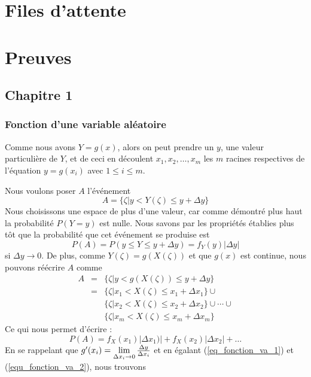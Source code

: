 \documentclass[11pt,a4paper]{article}
\numberwithin{equation}{section}
\begin{document}

\section{Files d'attente}

\appendix
\titleformat{\section}{\large\bfseries}{}{0pt}{\thesection\quad}
\section{Preuves}
\subsection{Chapitre 1}
\subsubsection{Fonction d'une variable aléatoire}
\label{preuve_fonction_va}
Comme nous avons $Y = g(x)$, alors on peut prendre un $y$, une valeur particulière de $Y$, et de ceci en découlent $x_1,x_2,\ldots,x_m$ les $m$ racines respectives de l'équation $y = g(x_i)$ avec $1 \leq i \leq m$.

Nous voulons poser $A$ l'événement 
\[A = \{\zeta| y < Y(\zeta) \leq y+\Delta y\}\]
Nous choisissons une espace de plus d'une valeur, car comme démontré plus haut la probabilité $P(Y=y)$ est nulle. Nous savons par les propriétés établies plus tôt que la probabilité que cet événement se produise est 
\begin{equation}
    P(A) = P(y \leq Y \leq y+\Delta y) = f_Y(y)|\Delta y|
    \label{eq_fonction_va_1}
\end{equation}
si $\Delta y \to 0$. De plus, comme $Y(\zeta) = g(X(\zeta))$ et que $g(x)$ est continue, nous pouvons réécrire $A$ comme
\[\begin{array}{lll}
    A   &=& \{\zeta | y <  g(X(\zeta)) \leq y+\Delta y\}\\
        &=& \{\zeta | x_1 < X(\zeta) \leq x_1+\Delta x_1\} \cup \\
        &&\{\zeta | x_2 < X(\zeta) \leq x_2+\Delta x_2\} \cup \cdots \cup\\
        && \{\zeta | x_m < X(\zeta) \leq x_m+\Delta x_m\}
\end{array}\]
Ce qui nous permet d'écrire :
\begin{equation}
    P(A) = f_X(x_1)|\Delta x_1)| + f_X(x_2)|\Delta x_2| + \ldots
    \label{equ_fonction_va_2}
\end{equation}
En se rappelant que $g'(x_i) = \lim\limits_{\Delta x_i \to 0} \frac{\Delta y}{\Delta x_i}$ et en égalant (\ref{eq_fonction_va_1}) et (\ref{equ_fonction_va_2}), nous trouvons 
\end{document}
